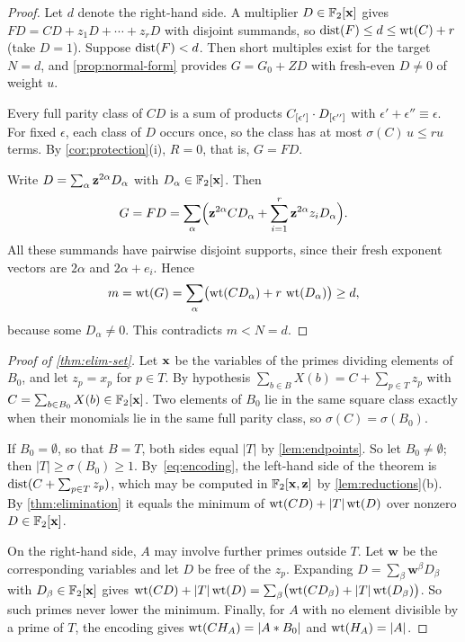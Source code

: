 \begin{proof}
Let $d$ denote the right-hand side. A multiplier $D\in\mathbb{F}_2[\mathbf{x}]$ gives $FD=CD+z_1D+\cdots+z_rD$ with disjoint summands, so $\operatorname{dist}(F)\le d\le\operatorname{wt}(C)+r$ (take $D=1$). Suppose $\operatorname{dist}(F)<d$. Then short multiples exist for the target $N=d$, and \cref{prop:normal-form} provides $G=G_0+ZD$ with fresh-even $D\ne0$ of weight $u$.

Every full parity class of $CD$ is a sum of products $C_{[\epsilon']}\cdot D_{[\epsilon'']}$ with $\epsilon'+\epsilon''\equiv\epsilon$. For fixed $\epsilon$, each class of $D$ occurs once, so the class has at most $\sigma(C)\,u\le ru$ terms. By \cref{cor:protection}(i), $R=0$, that is, $G=FD$.

Write $D=\sum_\alpha \mathbf{z}^{2\alpha}D_\alpha$ with $D_\alpha\in\mathbb{F}_2[\mathbf{x}]$. Then
\[
 G=FD=\sum_\alpha\Bigl(\mathbf{z}^{2\alpha}CD_\alpha+\sum_{i=1}^r\mathbf{z}^{2\alpha}z_iD_\alpha\Bigr).
\]
All these summands have pairwise disjoint supports, since their fresh exponent vectors are $2\alpha$ and $2\alpha+e_i$. Hence
\[
 m=\operatorname{wt}(G)=\sum_\alpha\bigl(\operatorname{wt}(CD_\alpha)+r\,\operatorname{wt}(D_\alpha)\bigr)\ge d,
\]
because some $D_\alpha\ne0$. This contradicts $m<N=d$.
\end{proof}

\begin{proof}[Proof of \cref{thm:elim-set}]
Let $\mathbf{x}$ be the variables of the primes dividing elements of $B_0$, and let $z_p=x_p$ for $p\in T$. By hypothesis $\sum_{b\in B}X(b)=C+\sum_{p\in T}z_p$ with $C=\sum_{b\in B_0}X(b)\in\mathbb{F}_2[\mathbf{x}]$. Two elements of $B_0$ lie in the same square class exactly when their monomials lie in the same full parity class, so $\sigma(C)=\sigma(B_0)$.

If $B_0=\emptyset$, so that $B=T$, both sides equal $|T|$ by \cref{lem:endpoints}. So let $B_0\ne\emptyset$; then $|T|\ge\sigma(B_0)\ge1$. By~\eqref{eq:encoding}, the left-hand side of the theorem is $\operatorname{dist}(C+\sum_{p\in T}z_p)$, which may be computed in $\mathbb{F}_2[\mathbf{x},\mathbf{z}]$ by \cref{lem:reductions}(b). By \cref{thm:elimination} it equals the minimum of $\operatorname{wt}(CD)+|T|\operatorname{wt}(D)$ over nonzero $D\in\mathbb{F}_2[\mathbf{x}]$.

On the right-hand side, $A$ may involve further primes outside $T$. Let $\mathbf w$ be the corresponding variables and let $D$ be free of the $z_p$. Expanding $D=\sum_\beta\mathbf w^\beta D_\beta$ with $D_\beta\in\mathbb{F}_2[\mathbf{x}]$ gives $\operatorname{wt}(CD)+|T|\operatorname{wt}(D)=\sum_\beta\bigl(\operatorname{wt}(CD_\beta)+|T|\operatorname{wt}(D_\beta)\bigr)$. So such primes never lower the minimum. Finally, for $A$ with no element divisible by a prime of $T$, the encoding gives $\operatorname{wt}(CH_A)=|A*B_0|$ and $\operatorname{wt}(H_A)=|A|$.
\end{proof}

